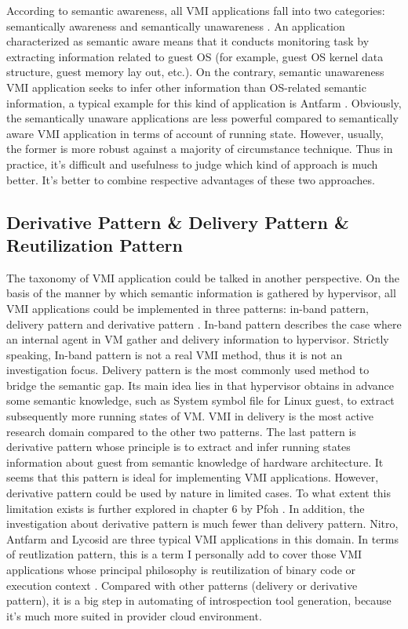 According to semantic awareness, all VMI applications fall into two categories: semantically awareness and semantically unawareness 
\cite{Reference3}. An application characterized as semantic aware means that it conducts monitoring task by extracting information 
related to guest OS (for example, guest OS kernel data structure, guest memory lay out, etc.). On the contrary, semantic unawareness 
VMI application seeks to infer other information than OS-related semantic information, a typical example for this kind of application 
is Antfarm  \cite{Reference4}. Obviously, the semantically unaware applications are less powerful compared to semantically aware VMI 
application in terms of account of running state. However, usually, the former is more robust against a majority of circumstance 
technique. Thus in practice, it’s difficult and usefulness to judge which kind of approach is much better. It’s better to combine 
respective advantages of these two approaches.

\subsection{Derivative Pattern \& Delivery Pattern \& Reutilization Pattern}

The taxonomy of VMI application could be talked in another perspective. On the basis of the manner by which semantic information is gathered by 
hypervisor, all VMI applications could be implemented in three patterns: in-band pattern, delivery pattern and derivative pattern \cite{Reference5}.
In-band pattern describes the case where an internal agent in VM gather and delivery information to hypervisor. Strictly speaking, In-band 
pattern is not a real VMI method, thus it is not an investigation focus. Delivery pattern is the most commonly used method to bridge the 
semantic gap. Its main idea lies in that hypervisor obtains in advance some semantic knowledge, such as System symbol file for Linux guest, 
to extract subsequently more running states of VM. VMI in delivery is the most active research domain compared to the other two patterns. 
The last pattern is derivative pattern whose principle is to extract and infer running states information about guest from semantic knowledge 
of hardware architecture. It seems that this pattern is ideal for implementing VMI applications. However, derivative pattern could be used by nature in 
limited cases. To what extent this limitation exists is further explored in chapter 6 by Pfoh \cite{Reference7}. In addition, the investigation 
about derivative pattern is much fewer than delivery pattern. Nitro, Antfarm and Lycosid \cite{Reference4, Reference8, Reference9} are three 
typical VMI applications in this domain. In terms of reutlization pattern, this is a term I personally add to cover those VMI applications
whose principal philosophy is reutilization of binary code or execution context \cite{Reference7, Reference28}. Compared with other 
patterns (delivery or derivative pattern), it is a big step in automating of introspection tool generation, because it's much more suited
in provider cloud environment.

